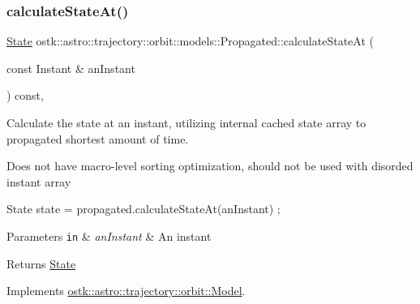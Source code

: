 \mbox{\label{classostk_1_1astro_1_1trajectory_1_1orbit_1_1models_1_1_propagated_a2efc3c1af735dcf2ec622d056fa0a13f}} 
\subsubsection{\texorpdfstring{calculate\+State\+At()}{calculateStateAt()}}
{\footnotesize\ttfamily \hyperlink{classostk_1_1astro_1_1trajectory_1_1_state}{State} ostk\+::astro\+::trajectory\+::orbit\+::models\+::\+Propagated\+::calculate\+State\+At (\begin{DoxyParamCaption}\item[{const Instant \&}]{an\+Instant }\end{DoxyParamCaption}) const\hspace{0.3cm}{\ttfamily [override]}, {\ttfamily [virtual]}}



Calculate the state at an instant, utilizing internal cached state array to propagated shortest amount of time. 

Does not have macro-\/level sorting optimization, should not be used with disorded instant array 
\begin{DoxyCode}
State state = propagated.calculateStateAt(anInstant) ;
\end{DoxyCode}
 
\begin{DoxyParams}[1]{Parameters}
\mbox{\tt in}  & {\em an\+Instant} & An instant \\
\hline
\end{DoxyParams}
\begin{DoxyReturn}{Returns}
\hyperlink{classostk_1_1astro_1_1trajectory_1_1_state}{State} 
\end{DoxyReturn}


Implements \hyperlink{classostk_1_1astro_1_1trajectory_1_1orbit_1_1_model_a34a0d8979ec1f7ade3e434fc0dad3711}{ostk\+::astro\+::trajectory\+::orbit\+::\+Model}.

\mbox{\label{classostk_1_1astro_1_1trajectory_1_1orbit_1_1models_1_1_propagated_a9a4097432d2c863aedead23d2d67a7a7}} 
